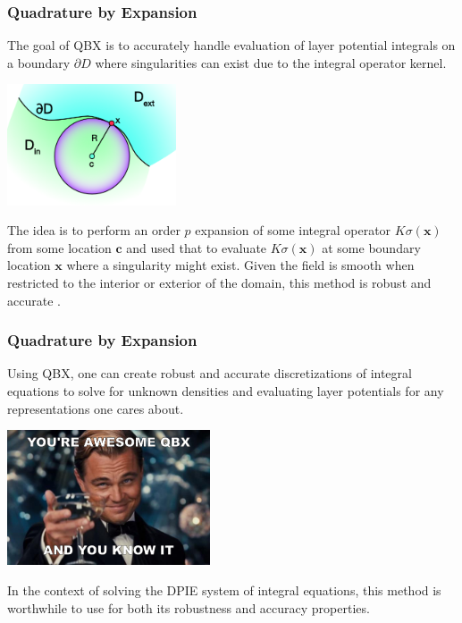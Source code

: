 \documentclass{beamer}
\newcommand{\bvec}[1]{\boldsymbol{#1}}
\begin{document}
	\begin{frame}
	\frametitle{Quadrature by Expansion}
	The goal of QBX is to accurately handle evaluation of layer potential integrals on a boundary $\partial D$ where singularities can exist due to the integral operator kernel. 
	
	\hfil\hfil\includegraphics[width=5cm]{qbx_image}\hfil\hfil
	
	The idea is to perform an order $p$ expansion of some integral operator $K \sigma (\bvec{x})$ from some location $\bvec{c}$ and used that to evaluate $K \sigma(\bvec{x})$ at some boundary location $\bvec{x}$ where a singularity might exist. Given the field is smooth when restricted to the interior or exterior of the domain, this method is robust and accurate \cite{qbx}.
	
	\end{frame}

	\begin{frame}
	\frametitle{Quadrature by Expansion}
	Using QBX, one can create robust and accurate discretizations of integral equations to solve for unknown densities and evaluating layer potentials for any representations one cares about. 
	
	\vspace{0.1in}
	\begin{center}
		\includegraphics[width=6cm]{qbxAwesome}
	\end{center}
	\vspace{0.1in}
	
	In the context of solving the DPIE system of integral equations, this method is worthwhile to use for both its robustness and accuracy properties.
	\end{frame}
\end{document}
